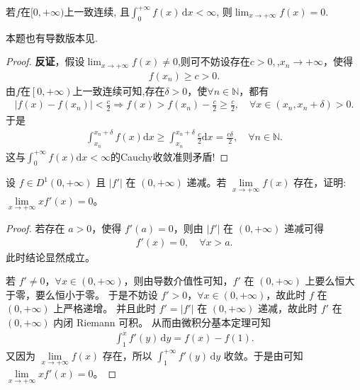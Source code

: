 \documentclass[../../main.tex]{subfiles}%
\begin{document}
\begin{proposition}\label{proposition:一致连续无穷积分收敛则极限为0}
若$f$在$[0, +\infty)$上一致连续, 且$\int_0^{+\infty} f(x) \, \mathrm{d}x < \infty$, 则$\lim_{x \to +\infty} f(x) = 0$.
\end{proposition}
\begin{note}
本题也有导数版本{见}.
\end{note}
\begin{proof}

\textbf{反证}，假设$\lim_{x\rightarrow +\infty} f\left( x \right) \ne 0$,则可不妨设存在$c>0,$,$x_n\rightarrow +\infty$，使得
\begin{align*}
f\left( x_n \right) \geqslant c>0.
\end{align*}
由$f$在$\left[ 0,+\infty \right)$上一致连续可知,存在$\delta >0$，使$\forall n\in \mathbb{N}$，都有
\begin{align*}
\left| f\left( x \right) -f\left( x_n \right) \right|<\frac{c}{2}\Longrightarrow f\left( x \right) >f\left( x_n \right) -\frac{c}{2}\geqslant \frac{c}{2},\quad \forall x\in \left( x_n,x_n+\delta \right) >0.
\end{align*}
于是
\begin{align*}
\int_{x_n}^{x_n+\delta}{f\left( x \right) \mathrm{d}x}\geqslant \int_{x_n}^{x_n+\delta}{\frac{c}{2}\mathrm{d}x}=\frac{c\delta}{2},\quad \forall n\in \mathbb{N} .
\end{align*}
这与$\int_0^{+\infty}{f\left( x \right) \mathrm{d}x}<\infty$的Cauchy收敛准则矛盾!

\end{proof}

\begin{example}
设 \(f\in D^{1}(0,+\infty)\) 且 \(|f'|\) 在 \((0,+\infty)\) 递减。若 \(\lim\limits_{x \to +\infty} f(x)\) 存在，证明: \(\lim\limits_{x \to +\infty} x f'(x)=0\)。 
\end{example}
\begin{proof}

若存在 \(a > 0\)，使得 \(f'(a) = 0\)，则由 \(|f'|\) 在 \((0, +\infty)\) 递减可得
\begin{align*}
f'(x) = 0, \quad \forall x > a.
\end{align*}
此时结论显然成立。

若 \(f' \neq 0\)，\(\forall x \in (0, +\infty)\)，则由导数介值性可知，\(f'\) 在 \((0, +\infty)\) 上要么恒大于零，要么恒小于零。
于是不妨设 \(f' > 0\)，\(\forall x \in (0, +\infty)\)，故此时 \(f\) 在 \((0, +\infty)\) 上严格递增。
并且此时 \(f' = |f'|\) 在 \((0, +\infty)\) 递减，故此时 \(f'\) 在 \((0, +\infty)\) 内闭 Riemann 可积。
从而由微积分基本定理可知
\begin{align*}
\int_1^x f'(y) \, \mathrm{d}y = f(x) - f(1).
\end{align*}
又因为 \(\lim\limits_{x \to +\infty} f(x)\) 存在，所以 \(\int_1^{+\infty} f'(y) \, \mathrm{d}y\) 收敛。于是由可知 \(\lim\limits_{x \to +\infty} x f'(x) = 0\)。

\end{proof}
\end{document}
